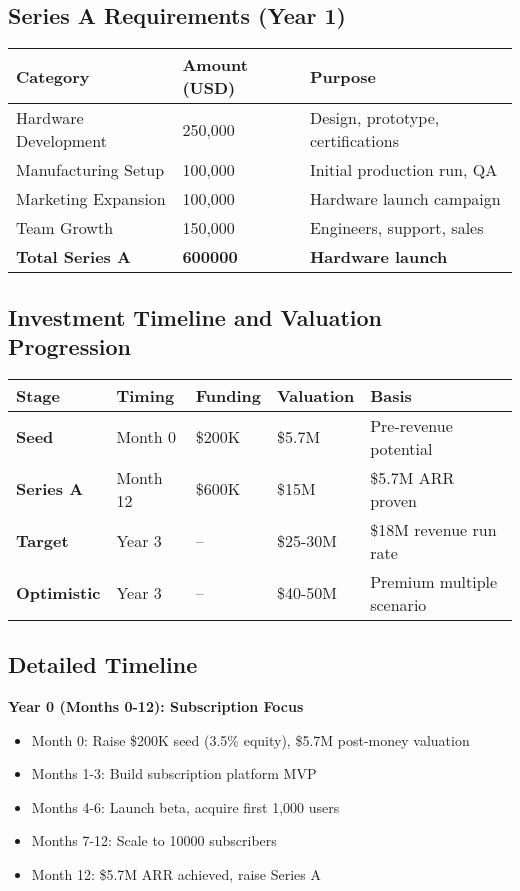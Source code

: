 \documentclass[11pt]{article}
\newcommand{\newSubsYearOne}{10000}
\newcommand{\seriesAAmount}{600000}
\newcommand{\seedEquity}{3.5}
\begin{document}
\subsection{Series A Requirements (Year 1)}
\begin{table}[H]
\centering
\begin{tabularx}{\linewidth}{l Y Y}
\toprule
Category & Amount (USD) & Purpose \\\midrule
Hardware Development\cite{ycombinator2022} & 250,000 & Design, prototype, certifications \\
Manufacturing Setup & 100,000 & Initial production run, QA \\
Marketing Expansion & 100,000 & Hardware launch campaign \\
Team Growth & 150,000 & Engineers, support, sales \\
\textbf{Total Series A} & \textbf{\seriesAAmount} & \textbf{Hardware launch} \\
\bottomrule
\end{tabularx}
\end{table}

\subsection{Investment Timeline and Valuation Progression}
\begin{table}[H]
\centering
\begin{tabularx}{\linewidth}{l Y Y Y Y}
\toprule
Stage & Timing & Funding & Valuation & Basis \\\midrule
\textbf{Seed} & Month 0 & \$200K & \$5.7M & Pre-revenue potential \\
\textbf{Series A} & Month 12 & \$600K & \$15M & \$5.7M ARR proven \\
\textbf{Target} & Year 3 & -- & \$25-30M & \$18M revenue run rate \\
\textbf{Optimistic} & Year 3 & -- & \$40-50M & Premium multiple scenario \\
\bottomrule
\end{tabularx}
\end{table}

\subsection{Detailed Timeline}

\textbf{Year 0 (Months 0-12): Subscription Focus}
\begin{itemize}
  \item Month 0: Raise \$200K seed (\seedEquity\% equity), \$5.7M post-money valuation
  \item Months 1-3: Build subscription platform MVP
  \item Months 4-6: Launch beta, acquire first 1,000 users
  \item Months 7-12: Scale to \newSubsYearOne{} subscribers
  \item Month 12: \$5.7M ARR achieved, raise Series A
\end{itemize}
\end{document}
